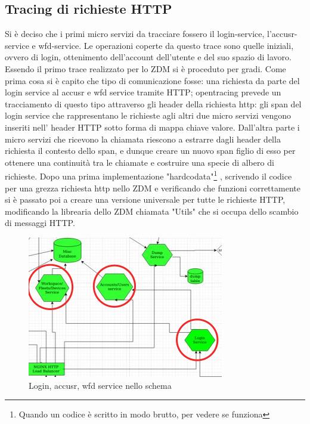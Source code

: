 \documentclass[a4paper,12pt,titlepage,italian,openany]{report}
\begin{document}
\subsection{Tracing di richieste HTTP}
Si è deciso che i primi micro servizi da tracciare fossero il login-service, l'accusr-service e wfd-service. Le operazioni coperte da questo trace sono quelle iniziali, ovvero di login, ottenimento dell'account dell'utente e del suo spazio di lavoro.
Essendo il primo trace realizzato per lo ZDM\cite{zdm:1} si è proceduto per gradi. Come prima cosa si è capito che tipo di comunicazione fosse: una richiesta da parte del login service al accusr e wfd service tramite HTTP;
opentracing prevede un tracciamento di questo tipo attraverso gli header della richiesta http: gli span del login service che rappresentano le richieste agli altri due micro servizi vengono inseriti nell' header HTTP sotto forma di mappa chiave valore.
Dall'altra parte i micro servizi che ricevono la chiamata riescono a estrarre dagli header della richiesta il contesto dello span, e dunque creare un nuovo span figlio di esso per ottenere una continuità tra le chiamate e costruire una specie di albero di richieste.
Dopo una prima implementazione "hardcodata"\footnote[1]{Quando un codice è scritto in modo brutto, per vedere se funziona} , scrivendo il codice per una grezza richiesta http nello ZDM\cite{zdm:1} e verificando che funzioni correttamente si è passato poi a creare una versione universale per tutte le richieste HTTP, modificando la librearia dello ZDM\cite{zdm:1} chiamata "Utils" che si occupa dello scambio di messaggi HTTP.
\begin{figure}[H]
    \includegraphics[]{42.png}
    \centering
    \caption{Login, accusr, wfd service nello schema}
\end{figure}
\end{document}
